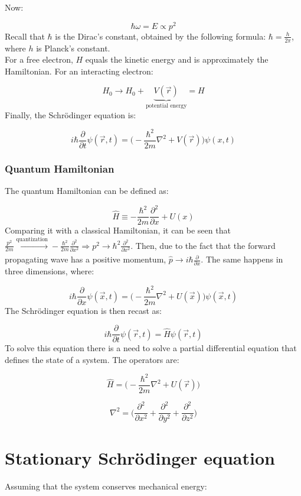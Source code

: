   Now:

  $$\hbar\omega = E \propto p^2$$
Recall that $\hbar$ is the Dirac's constant, obtained by the following formula: $\hbar=\frac{h}{2\pi}$, where $h$ is Planck's constant.\\
\noindent
  For a free electron, $H$ equals the kinetic energy and is approximately the Hamiltonian.
  For an interacting electron:

  $$H_0 \rightarrow H_0 + \underbrace{V(\vec{r})}_{\text{potential energy}} = H$$
\noindent
  Finally, the Schr\"odinger equation is:

  $$i\hbar \frac{\partial {}}{\partial {t}}\psi(\vec{r},t) = \biggl(-\frac{\hbar^2}{2m}\nabla^2+V(\vec{r})\biggr)\psi(x,t)$$

    \subsubsection{Quantum Hamiltonian}
    The quantum Hamiltonian can be defined as:

    $$\hat{H} \equiv -\frac{\hbar^2}{2m}\frac{\partial^2}{\partial x}+U(x)$$
\noindent
    Comparing it with a classical Hamiltonian, it can be seen that $\frac{p^2}{2m}\xrightarrow[]{\text{quantization}} - \frac{\hbar^2}{2m}\frac{\partial^2}{\partial x^2}\Rightarrow p^2\rightarrow \hbar^2\frac{\partial^2}{\partial x^2}$.
    Then, due to the fact that the forward propagating wave has a positive momentum, $\hat{p}\rightarrow i\hbar\frac{\partial}{\partial x}$.
    The same happens in three dimensions, where:

    $$i\hbar\frac{\partial }{\partial x}\psi(\vec{x}, t) = \biggl(-\frac{\hbar^2}{2m}\nabla^2+U(\vec{x})\biggr)\psi(\vec{x},t)$$
\noindent
    The Schr\"odinger equation is then recast as:

    $$i\hbar \frac{\partial {}}{\partial {t}}\psi(\vec{r},t) = \hat{H} \psi(\vec{r},t)$$
\noindent
    To solve this equation there is a need to solve a partial differential equation that defines the state of a system.
    The operators are:

    $$\hat{H} = \biggl(-\frac{\hbar^2}{2m}\nabla^2+U(\vec{r})\biggr)$$

    $$\nabla^2 = \biggl(\frac{\partial^2}{\partial x^2} +\frac{\partial^2}{\partial y^2} + \frac{\partial^2}{\partial z^2}\biggr)$$

\section{Stationary Schr\"odinger equation}
Assuming that the system conserves mechanical energy:

